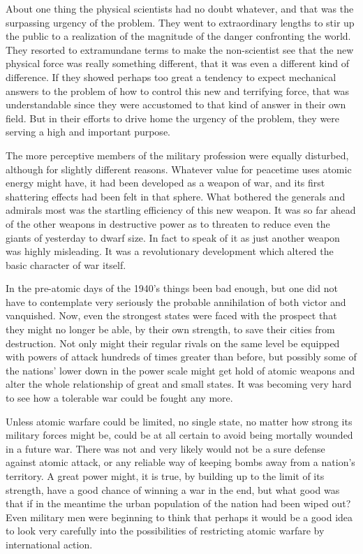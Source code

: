 \begin{introduction}
About one thing the physical scientists had no doubt whatever, and that was the surpassing urgency of the problem. They went to extraordinary lengths to stir up the public to a realization of the magnitude of the danger confronting the world. They resorted to extramundane terms to make the non-scientist see that the new physical force was really something different, that it was even a different kind of difference. If they showed perhaps too great a tendency to expect mechanical answers to the problem of how to control this new and terrifying force, that was understandable since they were accustomed to that kind of answer in their own field. But in their efforts to drive home the urgency of the problem, they were serving a high and important purpose.

The more perceptive members of the military profession were equally disturbed, although for slightly different reasons. Whatever value for peacetime uses atomic energy might have, it had been developed as a weapon of war, and its first shattering effects had been felt in that sphere. What bothered the generals and admirals most was the startling efficiency of this new weapon. It was so far ahead of the other weapons in destructive power as to threaten to reduce even the giants of yesterday to dwarf size. In fact to speak of it as just another weapon was highly misleading. It was a revolutionary development which altered the basic character of war itself.

In the pre-atomic days of the 1940's things been bad enough, but one did not have to contemplate very seriously the probable annihilation of both victor and vanquished. Now, even the strongest states were faced with the prospect that they might no longer be able, by their own strength, to save their cities from destruction. Not only might their regular rivals on the same level be equipped with powers of attack hundreds of times greater than before, but possibly some of the nations' lower down in the power scale might get hold of atomic weapons and alter the whole relationship of great and small states. It was becoming very hard to see how a tolerable war could be fought any more.

Unless atomic warfare could be limited, no single state, no matter how strong its military forces might be, could be at all certain to avoid being mortally wounded in a future war. There was not and very likely would not be a sure defense against atomic attack, or any reliable way of keeping bombs away from a nation's territory. A great power might, it is true, by building up to the limit of its strength, have a good chance of winning a war in the end, but what good was that if in the meantime the urban population of the nation had been wiped out? Even military men were beginning to think that perhaps it would be a good idea to look very carefully into the possibilities of restricting atomic warfare by international action.


\end{introduction}
